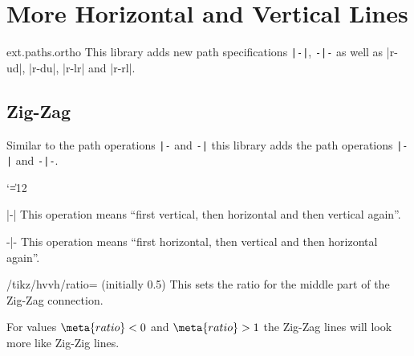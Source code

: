 %
%
%

\section{More Horizontal and Vertical Lines}
\label{library:paths.ortho}

\begin{tikzlibrary}{ext.paths.ortho}
  This library adds new path specifications \verb!|-|!, \verb!-|-! as well as
  |r-ud|, |r-du|, |r-lr| and |r-rl|.
\end{tikzlibrary}

\subsection{Zig-Zag}
Similar to the path operations \verb!|-! and \verb!-|! this library adds\indexPathOperationO{\protect\pgfmanualbar-}\indexPathOperationO{-\protect\pgfmanualbar}
the path operations \verb!|-|! and \verb!-|-!.
{\catcode`\|=12
\begin{pathoperation}[noindex]{|-|}{}
    \pgfmanualpdflabel[\catcode`\|=12 ]{|-|}{}%
    This operation means ``first vertical, then horizontal and then vertical again''.
\end{pathoperation}
\begin{pathoperation}[noindex]{-|-}{}
    \pgfmanualpdflabel[\catcode`\|=12 ]{-|-}{}%
    This operation means ``first horizontal, then vertical and then horizontal again''.
\end{pathoperation}
}
\begin{key}{/tikz/hvvh/ratio= (initially 0.5)}
  This sets the ratio for the middle part of the Zig-Zag connection.
  
  For values $\meta{ratio} < 0$ and $\meta{ratio} > 1$ the Zig-Zag lines will
  look more like Zig-Zig lines.
\begin{codeexample}[preamble=\usetikzlibrary{paths.ortho}]
\end{codeexample}
\end{key}
